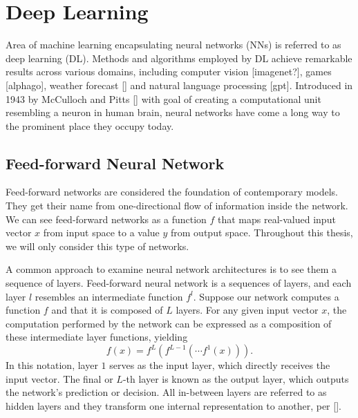 
\section{Deep Learning}

Area of machine learning encapsulating neural networks (NNs) is referred to as deep learning (DL).
Methods and algorithms employed by DL achieve remarkable results across various domains, including computer vision [imagenet?], games [alphago], weather forecast [] and natural language processing [gpt]. 
Introduced in 1943 by McCulloch and Pitts [] with goal of creating a computational unit resembling a neuron in human brain, neural networks have come a long way to the prominent place they occupy today.


\subsection*{Feed-forward Neural Network}

Feed-forward networks are considered the foundation of contemporary models.
They get their name from one-directional flow of information inside the network.
We can see feed-forward networks as a function $f$ that maps real-valued input vector $x$ from input space to a value $y$ from output space.
Throughout this thesis, we will only consider this type of networks.

A common approach to examine neural network architectures is to see them a sequence of layers.
Feed-forward neural network is a sequences of layers, and each layer $l$ resembles an intermediate function $f^l$.
Suppose our network computes a function $f$ and that it is composed of $L$ layers.
For any given input vector $x$, the computation performed by the network can be expressed as a composition of these intermediate layer functions, yielding
\begin{equation}
    f(x) = f^L(f^{L-1}(\cdots f^1(x))).
\end{equation}
In this notation, layer $1$ serves as the input layer, which directly receives the input vector. The final or $L$-th layer is known as the output layer, which outputs the network's prediction or decision. All in-between layers are referred to as hidden layers and they transform one internal representation to another, per [].

